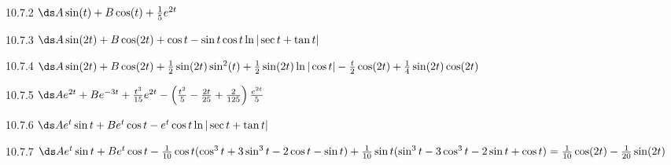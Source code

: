 \begin{Answer}{10.7.2}
 $\ds A\sin(t)+B\cos(t)+{1\over5}e^{2t}$
\end{Answer}
\begin{Answer}{10.7.3}
 $\ds A\sin(2t)+B\cos(2t)+\cos t-\sin t\cos t\ln|\sec t+\tan t|$
\end{Answer}
\begin{Answer}{10.7.4}
 $\ds A\sin(2t)+B\cos(2t)+{1\over2}\sin(2t)\sin^2(t)+
{1\over2}\sin(2t)\ln|\cos t|-{t\over2}\cos(2t)+{1\over4}\sin(2t)\cos(2t)$
\end{Answer}
\begin{Answer}{10.7.5}
 $\ds Ae^{2t}+Be^{-3t}+{t^3\over15}e^{2t}-\left({t^2\over5}
-{2t\over25}+{2\over125}\right){e^{2t}\over5}$
\end{Answer}
\begin{Answer}{10.7.6}
 $\ds Ae^{t}\sin t+Be^{t}\cos t-e^t\cos t\ln|\sec t+\tan t|$
\end{Answer}
\begin{Answer}{10.7.7}
 $\ds Ae^{t}\sin t+Be^{t}\cos t-
{1\over10}\cos t(\cos^3 t+3\sin^3 t-2\cos t-\sin t)+
{1\over10}\sin t(\sin^3 t-3\cos^3 t-2\sin t+\cos t)=
{1\over10}\cos(2t)-{1\over20}\sin(2t)$
\end{Answer}
